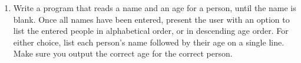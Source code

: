 \begin{enumerate}
	\item Write a program that reads a name and an age for a person, until    the name is blank. Once all names have been entered, present the user with an    option to list the entered people in alphabetical order, or in    descending age order. For either choice, list each person's name    followed by their age on a single line. Make sure you output the    correct age for the correct person.
% 
% 
% 
% 			

\end{enumerate}
